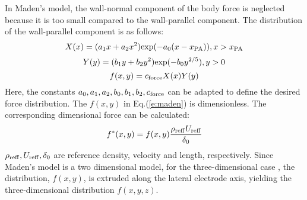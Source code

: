 \documentclass{AIAA}
\begin{document}
In Maden's model, the wall-normal component of the body force is neglected because it is too small compared to the wall-parallel component. The distribution of the wall-parallel component is as follows:
\begin{equation}
    \label{e:madenX}
    X(x)=(a_1x+a_2x^2){\rm exp}(-a_0(x-x_{\rm PA})),x>x_{\rm PA}
\end{equation}
\begin{equation}
    \label{e:madenY}
    Y(y)=(b_1y+b_2y^2){\rm exp}(-b_0y^{2/5}),y>0
\end{equation}
\begin{equation}
    \label{e:maden}
    f(x,y)=c_{\rm force}X(x)Y(y)
\end{equation}
Here, the constants $a_0,a_1,a_2,b_0,b_1,b_2,c_{\rm force}$ can be adapted to define the desired force distribution. The $f(x,y)$ in Eq.(\ref{e:maden}) is dimensionless. The corresponding dimensional force can be calculated:
\begin{equation}
    f^*(x,y)=f(x,y)\frac{\rho_{\rm reff}U_{\rm reff}}{\delta_{0}}
\end{equation}
$\rho_{\rm reff},U_{\rm reff},\delta_{0}$ are reference density, velocity and length, respectively. Since Maden's model is a two dimensional model, for the three-dimensional case , the distribution, $f(x,y)$, is extruded along the lateral electrode axis, yielding the three-dimensional distribution $f(x,y,z)$.
\end{document}

